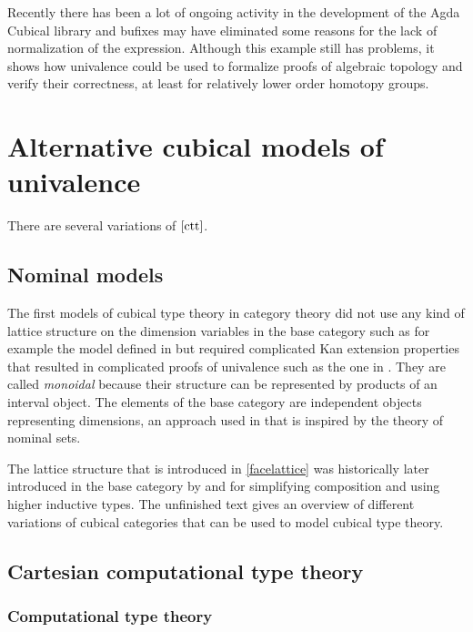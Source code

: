 \documentclass[11pt,a4paper,twoside,xetex,draft]{book}
\newcommand{\keyword}[1]{\emph{#1}\index{#1}}
\begin{document}
Recently there has been a lot of ongoing activity in the development of the Agda Cubical library and bufixes may have eliminated some reasons for the lack of normalization of the expression. Although this example still has problems, it shows how univalence could be used to formalize proofs of algebraic topology and verify their correctness, at least for relatively lower order homotopy groups.

\section{Alternative cubical models of univalence}

There are several variations of $\cref{ctt}$.

\subsection{Nominal models}\label{cartmod}

The first models of cubical type theory in category theory did not use any kind of lattice structure on the dimension variables in the base category such as for example the model defined in \cite{Bezem2014} but required complicated Kan extension properties that resulted in complicated proofs of univalence such as the one in \cite{Bezem2018}. They are called \keyword{monoidal} because their structure can be represented by products of an interval object. The elements of the base category are independent objects representing dimensions, an approach used in \cite{Huber2016} that is inspired by the theory of nominal sets. 

The lattice structure that is introduced in \cref{facelattice} was historically later introduced in the base category by \cite{Cohen2016} and \cite{Huber2016} for simplifying composition and using higher inductive types. The unfinished text \cite{Awodey2016June} gives an overview of different variations of cubical categories that can be used to model cubical type theory.


\subsection{Cartesian computational type theory}\label{comptt}

\subsubsection{Computational type theory}
\end{document}
